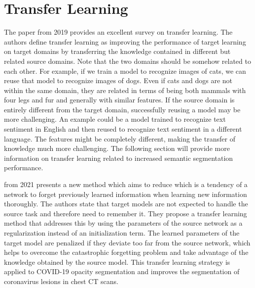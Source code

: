 \section{Transfer Learning}
The paper  \cite{DBLP:journals/corr/abs-1911-02685} from 2019 provides an excellent survey on transfer learning. The authors define transfer learning as improving the performance of target learning on target domains by transferring the knowledge contained in different but related source domains. Note that the two domains should be somehow related to each other. For example, if we train a model to recognize images of cats, we can reuse that model to recognize images of dogs. Even if cats and dogs are not within the same domain, they are related in terms of being both mammals with four legs and fur and generally with similar features. If the source domain is entirely different from the target domain, successfully reusing a model may be more challenging.
An example could be a model trained to recognize text sentiment in English and then reused to recognize text sentiment in a different language. The features might be completely different, making the transfer of knowledge much more challenging. The following section will provide more information on transfer learning related to increased semantic segmentation performance.

 \cite{9616331} from 2021 presents a new method which aims to reduce  \cite{mccloskey1989catastrophic} which is a tendency of a network to forget previously learned information when learning new information thoroughly. The authors state that target models are not expected to handle the source task and therefore need to remember it. They propose a transfer learning method that addresses this  by using the parameters of the source network as a regularization instead of an initialization term. The learned parameters of the target model are penalized if they deviate too far from the source network, which helps to overcome the catastrophic forgetting problem and take advantage of the knowledge obtained by the source model. This transfer learning strategy is applied to COVID-19 opacity segmentation and improves the segmentation of coronavirus lesions in chest CT scans.

